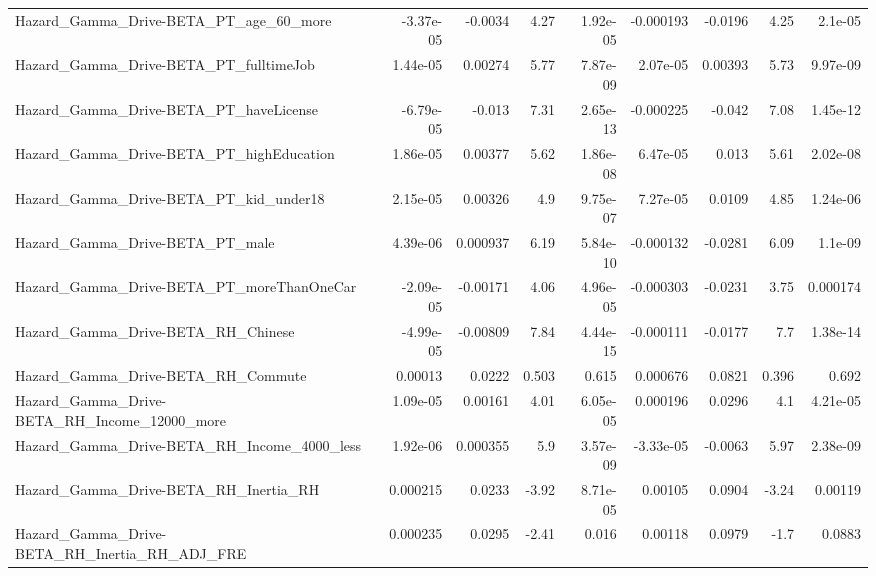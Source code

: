 \begin{tabular}{lrrrrrrrr}
Hazard\_Gamma\_Drive-BETA\_PT\_age\_60\_more             &   -3.37e-05 &      -0.0034 &     4.27 & 1.92e-05 &  -0.000193 &     -0.0196 &         4.25 &       2.1e-05 \\
Hazard\_Gamma\_Drive-BETA\_PT\_fulltimeJob             &    1.44e-05 &      0.00274 &     5.77 & 7.87e-09 &   2.07e-05 &     0.00393 &         5.73 &      9.97e-09 \\
Hazard\_Gamma\_Drive-BETA\_PT\_haveLicense             &   -6.79e-05 &       -0.013 &     7.31 & 2.65e-13 &  -0.000225 &      -0.042 &         7.08 &      1.45e-12 \\
Hazard\_Gamma\_Drive-BETA\_PT\_highEducation           &    1.86e-05 &      0.00377 &     5.62 & 1.86e-08 &   6.47e-05 &       0.013 &         5.61 &      2.02e-08 \\
Hazard\_Gamma\_Drive-BETA\_PT\_kid\_under18             &    2.15e-05 &      0.00326 &      4.9 & 9.75e-07 &   7.27e-05 &      0.0109 &         4.85 &      1.24e-06 \\
Hazard\_Gamma\_Drive-BETA\_PT\_male                    &    4.39e-06 &     0.000937 &     6.19 & 5.84e-10 &  -0.000132 &     -0.0281 &         6.09 &       1.1e-09 \\
Hazard\_Gamma\_Drive-BETA\_PT\_moreThanOneCar          &   -2.09e-05 &     -0.00171 &     4.06 & 4.96e-05 &  -0.000303 &     -0.0231 &         3.75 &      0.000174 \\
Hazard\_Gamma\_Drive-BETA\_RH\_Chinese                 &   -4.99e-05 &     -0.00809 &     7.84 & 4.44e-15 &  -0.000111 &     -0.0177 &          7.7 &      1.38e-14 \\
Hazard\_Gamma\_Drive-BETA\_RH\_Commute                 &     0.00013 &       0.0222 &    0.503 &    0.615 &   0.000676 &      0.0821 &        0.396 &         0.692 \\
Hazard\_Gamma\_Drive-BETA\_RH\_Income\_12000\_more       &    1.09e-05 &      0.00161 &     4.01 & 6.05e-05 &   0.000196 &      0.0296 &          4.1 &      4.21e-05 \\
Hazard\_Gamma\_Drive-BETA\_RH\_Income\_4000\_less        &    1.92e-06 &     0.000355 &      5.9 & 3.57e-09 &  -3.33e-05 &     -0.0063 &         5.97 &      2.38e-09 \\
Hazard\_Gamma\_Drive-BETA\_RH\_Inertia\_RH              &    0.000215 &       0.0233 &    -3.92 & 8.71e-05 &    0.00105 &      0.0904 &        -3.24 &       0.00119 \\
Hazard\_Gamma\_Drive-BETA\_RH\_Inertia\_RH\_ADJ\_FRE      &    0.000235 &       0.0295 &    -2.41 &    0.016 &    0.00118 &      0.0979 &         -1.7 &        0.0883 \\

\end{tabular}
